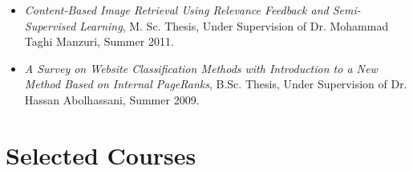 \documentclass[11pt,a4paper,sans]{moderncv}        %
\begin{document}
{
\begin{itemize}
\item \emph{Content-Based Image Retrieval Using Relevance Feedback and Semi-Supervised Learning}, M. Sc. Thesis, Under Supervision of Dr. Mohammad Taghi Manzuri, Summer 2011.
\item \emph{A Survey on Website Classification Methods with Introduction to a  New Method Based on Internal PageRanks}, B.Sc. Thesis, Under Supervision of Dr. Hassan Abolhassani, Summer 2009.\vspace*{10pt}
\end{itemize}
}



\section{Selected Courses}
\vspace*{10pt}

\end{document}
